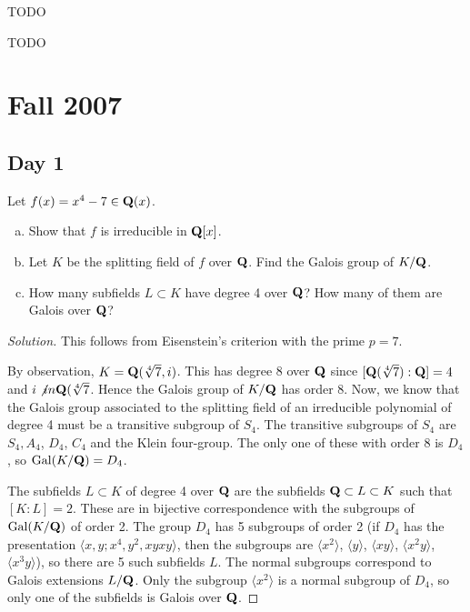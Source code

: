 
TODO


TODO

\section{Fall 2007}
\label{S:fall-2007}

\subsection{Day 1}
\label{S:fall-2007-1}
\mbox{}


Let $f(x) = x^4 - 7 \in \mathbf{Q}(x)$.
\begin{enumerate}[(a)]
\item Show that $f$ is irreducible in $\mathbf{Q}[x]$.
\item Let $K$ be the splitting field of $f$ over $\mathbf{Q}$.  Find the Galois group of $K/\mathbf{Q}$.
\item How many subfields $L \subset K$ have degree 4 over $\mathbf{Q}$?  How many of them are Galois over $\mathbf{Q}$?
\end{enumerate}

\begin{proof}[Solution]
  This follows from Eisenstein's criterion with the prime $p = 7$.

  By observation, $K = \mathbf{Q}(\sqrt[4]{7}, i)$.  This has degree 8 over $\mathbf{Q}$ since $[\mathbf{Q}(\sqrt[4]{7}) : \mathbf{Q}] = 4$ and $i \not in \mathbf{Q}(\sqrt[4]{7}$.  Hence the Galois group of $K/\mathbf{Q}$ has order 8.  Now, we know that the Galois group associated to the splitting field of an irreducible polynomial of degree 4 must be a transitive subgroup of $S_4$.  The transitive subgroups of $S_4$ are $S_4, A_4$, $D_4$, $C_4$ and the Klein four-group.  The only one of these with order $8$ is $D_4$, so $\mathrm{Gal}(K/\mathbf{Q}) = D_4$.
  
  The subfields $L \subset K$ of degree 4 over $\mathbf{Q}$ are the subfields $\mathbf{Q} \subset L \subset K$ such that $[K : L] = 2$.  These are in bijective correspondence with the subgroups of $\mathrm{Gal}(K/\mathbf{Q})$ of order 2.  The group $D_4$ has 5 subgroups of order 2 (if $D_4$ has the presentation $\langle x, y; x^4, y^2, xyxy\rangle$, then the subgroups are $\langle x^2 \rangle$, $\langle y \rangle$, $\langle xy \rangle$, $\langle x^2y \rangle$, $\langle x^3y \rangle$), so there are 5 such subfields $L$.  The normal subgroups correspond to Galois extensions $L/\mathbf{Q}$.  Only the subgroup $\langle x^2 \rangle$ is a normal subgroup of $D_4$, so only one of the subfields is Galois over $\mathbf{Q}$.
\end{proof}

